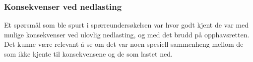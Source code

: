 \subsubsection{Konsekvenser ved nedlasting}
Et spørsmål som ble spurt i spørreundersøkelsen var hvor godt kjent de var med mulige konsekvenser ved ulovlig nedlasting, og med det brudd på opphavsretten. Det kunne være relevant å se om det var noen spesiell sammenheng mellom de som ikke kjente til konsekvensene og de som lastet ned. 

